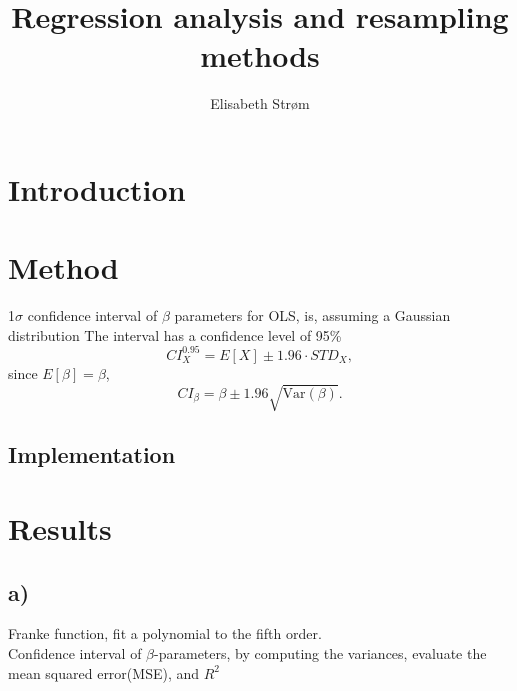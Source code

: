 \documentclass[a4paper,10pt,english]{article}
\title{Regression analysis and resampling methods}
\author{Elisabeth Strøm}
\begin{document}
\maketitle

\pagebreak

\tableofcontents

\pagebreak


\section{Introduction}
\section{Method}

1$\sigma$ confidence interval of $\beta$ parameters for OLS, is, assuming a Gaussian distribution
The interval has a confidence level of 95\%
\begin{equation}
CI_{X}^{0.95} = E[X] \pm 1.96\cdot STD_X,
\end{equation}
since $E[\beta]=\beta$,
\begin{equation}
CI_\beta= \beta \pm 1.96\sqrt{\mathrm{Var}(\beta)}.
\end{equation}
\subsection{Implementation}
\section{Results}

\subsection{a)}
Franke function, fit a polynomial to the fifth order.\\

Confidence interval of $\beta$-parameters, by computing the variances, evaluate the mean squared error(MSE), and $R^2$
\end{document}
